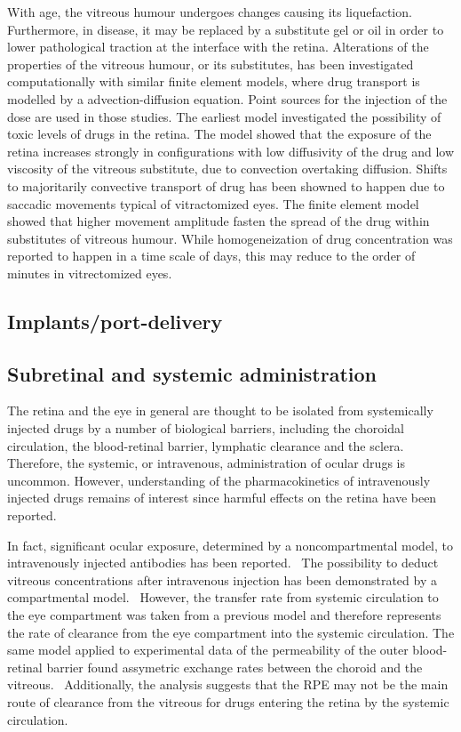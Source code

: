 \documentclass[12pt,a4paper]{journal}
\begin{document}
With age, the vitreous humour undergoes changes causing its liquefaction.
Furthermore, in disease, it may be replaced by a substitute gel or oil in order to lower pathological traction at the interface with the retina.
Alterations of the properties of the vitreous humour, or its substitutes, has been investigated computationally with similar finite element models, where drug transport is modelled by a advection-diffusion equation.\cite{Kathawate_2008,Modareszadeh_2012}
Point sources for the injection of the dose are used in those studies.
The earliest model investigated the possibility of toxic levels of drugs in the retina.\cite{Kathawate_2008}
The model showed that the exposure of the retina increases strongly in configurations with low diffusivity of the drug and low viscosity of the vitreous substitute, due to convection overtaking diffusion.\cite{Kathawate_2008}
Shifts to majoritarily convective transport of drug has been showned to happen due to saccadic movements typical of vitractomized eyes.\cite{Modareszadeh_2012}
The finite element model showed that higher movement amplitude fasten the spread of the drug within substitutes of vitreous humour.
While homogeneization of drug concentration was reported to happen in a time scale of days, this may reduce to the order of minutes in vitrectomized eyes.\cite{Modareszadeh_2012}

\subsection*{Implants/port-delivery}


\subsection*{Subretinal and systemic administration}

The retina and the eye in general are thought to be isolated from systemically injected drugs by a number of biological barriers, including the choroidal circulation, the blood-retinal barrier, lymphatic clearance and the sclera.
Therefore, the systemic, or intravenous, administration of ocular drugs is uncommon.
However, understanding of the pharmacokinetics of intravenously injected drugs remains of interest since harmful effects on the retina have been reported.~\cite{Fu_2017}

In fact, significant ocular exposure, determined by a noncompartmental model, to intravenously injected antibodies has been reported.~\cite{Shivva_2021}
The possibility to deduct vitreous concentrations after intravenous injection has been demonstrated by a compartmental model.~\cite{Vellonen_2015}
However, the transfer rate from systemic circulation to the eye compartment was taken from a previous model and therefore represents the rate of clearance from the eye compartment into the systemic circulation.
The same model applied to experimental data of the permeability of the outer blood-retinal barrier found assymetric exchange rates between the choroid and the vitreous.~\cite{Ramsay_2019}
Additionally, the analysis suggests that the RPE may not be the main route of clearance from the vitreous for drugs entering the retina by the systemic circulation.~\cite{Ramsay_2019}
\end{document}

